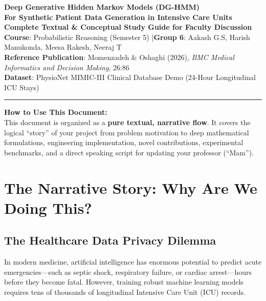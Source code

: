 \documentclass[11pt,a4paper]{article}
\begin{document}
\begin{center}
    {\LARGE\bfseries\color{primary} Deep Generative Hidden Markov Models (DG-HMM)}\\[6pt]
    {\large\bfseries For Synthetic Patient Data Generation in Intensive Care Units}\\[10pt]
    {\normalsize\textbf{Complete Textual \& Conceptual Study Guide for Faculty Discussion}}\\[12pt]
    \small
    \textbf{Course}: Probabilistic Reasoning (Semester 5) \quad|\quad \textbf{Group 6}: Aakash G.S, Harish Manukonda, Meesa Rakesh, Neeraj T\\[4pt]
    \textbf{Reference Publication}: Momenzadeh \& Oshaghi (2026), \textit{BMC Medical Informatics and Decision Making}, 26:86\\[4pt]
    \textbf{Dataset}: PhysioNet MIMIC-III Clinical Database Demo (24-Hour Longitudinal ICU Stays)
\end{center}

\vspace{8pt}
\hrule
\vspace{12pt}

\begin{tcolorbox}
\textbf{How to Use This Document:}\\
This document is organized as a \textbf{pure textual, narrative flow}. It covers the logical ``story'' of your project from problem motivation to deep mathematical formulations, engineering implementation, novel contributions, experimental benchmarks, and a direct speaking script for updating your professor (``Mam'').
\end{tcolorbox}

\section{The Narrative Story: Why Are We Doing This?}

\subsection{The Healthcare Data Privacy Dilemma}
In modern medicine, artificial intelligence has enormous potential to predict acute emergencies—such as septic shock, respiratory failure, or cardiac arrest—hours before they become fatal. However, training robust machine learning models requires tens of thousands of longitudinal Intensive Care Unit (ICU) records. 
\end{document}

